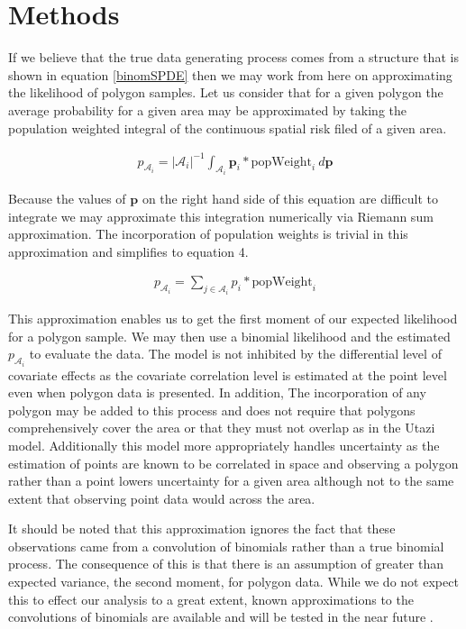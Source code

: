 \documentclass{article}
\begin{document}
\section{Methods}\label{methods}

If we believe that the true data generating process comes from a structure that is shown in equation \ref{binomSPDE} then we may work from here on approximating the likelihood of polygon samples. Let us consider that for a given polygon the average probability for a given area may be approximated by taking the population weighted integral of the continuous spatial risk filed of a given area. 

\begin{align}\label{pIntegral}
p_{\mathcal{A}_i} = |\mathcal{A}_i|^{-1}\int_{\mathcal{A}_i} \boldsymbol{p}_i * \text{popWeight}_i ~ d\boldsymbol{p}
\end{align}

Because the values of $\boldsymbol{p}$ on the right hand side of this equation are difficult to integrate we may approximate this integration numerically via Riemann sum approximation. The incorporation of population weights is trivial in this approximation and simplifies to equation 4.

\begin{align}\label{pRiemann}
p_{\mathcal{A}_i} = \sum_{j \in \mathcal{A}_i} p_i * \text{popWeight}_i
\end{align}

This approximation enables us to get the first moment of our expected likelihood for a polygon sample. We may then use a binomial likelihood and the estimated $p_{\mathcal{A}_i}$ to evaluate the data. The model is not inhibited by the differential level of covariate effects as the covariate correlation level is estimated at the point level even when polygon data is presented. In addition, The incorporation of any polygon may be added to this process and does not require that polygons comprehensively cover the area or that they must not overlap as in the Utazi model. Additionally this model more appropriately handles uncertainty as the estimation of points are known to be correlated in space and observing a polygon rather than a point lowers uncertainty for a given area although not to the same extent that observing point data would across the area.

It should be noted that this approximation ignores the fact that these observations came from a convolution of binomials rather than a true binomial process. The consequence of this is that there is an assumption of greater than expected variance, the second moment, for polygon data. While we do not expect this to effect our analysis to a great extent, known approximations to the convolutions of binomials are available and will be tested in the near future \cite{Liu2017}.
\end{document}
